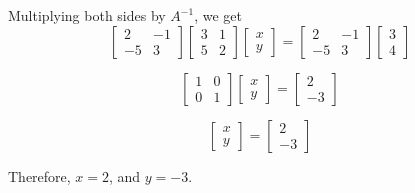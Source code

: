 \begin{solution}
    Multiplying both sides by \( A^{-1} \), we get
    \[
        \left[
            \begin{array}{cc}
                2  & -1 \\
                -5 & 3
            \end{array}
            \right]
        \left[
            \begin{array}{cc}
                3 & 1 \\
                5 & 2
            \end{array}
            \right]
        \left[
            \begin{array}{c}
                x \\
                y
            \end{array}
            \right]
        =
        \left[
            \begin{array}{cc}
                2  & -1 \\
                -5 & 3
            \end{array}
            \right]
        \left[
            \begin{array}{c}
                3 \\
                4
            \end{array}
            \right]
    \]

    \[
        \left[
            \begin{array}{cc}
                1 & 0 \\
                0 & 1
            \end{array}
            \right]
        \left[
            \begin{array}{c}
                x \\
                y
            \end{array}
            \right]
        =
        \left[
            \begin{array}{c}
                2 \\
                -3
            \end{array}
            \right]
    \]

    \[
        \left[
            \begin{array}{c}
                x \\
                y
            \end{array}
            \right]
        =
        \left[
            \begin{array}{c}
                2 \\
                -3
            \end{array}
            \right]
    \]

    Therefore, \( x = 2 \), and \( y = -3 \).
\end{solution}

